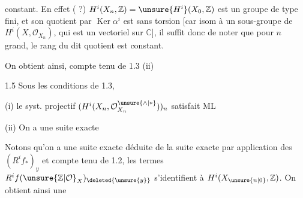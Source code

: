 constant. En effet ( ?) $H^i(X_n,\mathbb Z)=\unsure{H^i}(X_0,\mathbb Z)$ est un groupe de type fini, et son quotient par $\operatorname{Ker}\alpha^i$ est sans torsion [car isom à un sous-groupe de $H^i(X,\mathcal O_{X_n})$, qui est un vectoriel sur $\mathbb C$],  il suffit donc de noter que pour $n$ grand, le rang du dit quotient est constant.

On obtient ainsi, compte tenu de 1.3 (ii) 

\uline{} 1.5 Sous les conditions de 1.3,

(i) le syst. projectif $(H^i(X_n,\mathcal O_{X_n}^{\unsure{\wedge|*}}))_n$ satisfait ML

(ii) On a une suite exacte
\margin{\deleted{\unsure{*}}}

Notons qu'on a une suite exacte déduite de la suite exacte
par application des $(R^if_*)_y$ et compte tenu de 1.2, les  termes $R^if(\unsure{\mathbb Z|\mathcal O}_X)_{\deleted{\unsure{y}}}$  s'identifient à $H^i(X_{\unsure{n|0}},\mathbb Z)$. On obtient ainsi une
